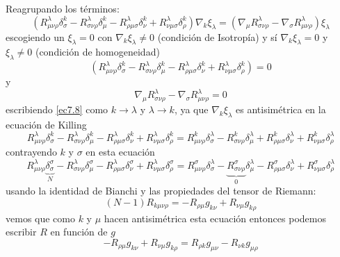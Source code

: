 \documentclass[../main]{subfiles}
\begin{document}
\begin{adjustwidth}{0pt}{-100pt}
Reagrupando los términos:
\begin{equation}
    (R^{\lambda}_{\mu\nu\rho}\delta^k_{\sigma}-R^{\lambda}_{\sigma\nu\rho}\delta^k_{\mu}-R^{\lambda}_{\rho\mu\sigma}\delta^k_{\nu}+R^{\lambda}_{\nu\mu\sigma}\delta^k_{\rho})\nabla_k \xi_{\lambda}=(\nabla_{\mu}R^{\lambda}_{\sigma\nu\rho}-\nabla_{\sigma}R^{\lambda}_{\mu\nu\rho})\xi_{\lambda}
\end{equation}
escogiendo un $\xi_{\lambda}=0$ con $\nabla_k \xi_{\lambda} \neq 0$ (condición de Isotropía) y sí $\nabla_k \xi_{\lambda}=0$ y $\xi_{\lambda} \neq 0$ (condición de homogeneidad)
\begin{equation}
    (R^{\lambda}_{\mu\nu\rho}\delta^k_{\sigma}-R^{\lambda}_{\sigma\nu\rho}\delta^k_{\mu}-R^{\lambda}_{\rho\mu\sigma}\delta^k_{\nu}+R^{\lambda}_{\nu\mu\sigma}\delta^k_{\rho})=0
    \label{ec7.8}
\end{equation}
y
\begin{equation}
    \nabla_{\mu}R^{\lambda}_{\sigma\nu\rho}-\nabla_{\sigma}R^{\lambda}_{\mu\nu\rho}=0
\end{equation}
escribiendo \eqref{ec7.8} como $k\rightarrow \lambda$ y $\lambda\rightarrow k$, ya que $\nabla_k \xi_{\lambda}$ es antisimétrica en la ecuación de Killing
\begin{equation}
    R^{\lambda}_{\mu\nu\rho}\delta^k_{\sigma}-R^{\lambda}_{\sigma\nu\rho}\delta^k_{\mu}-R^{\lambda}_{\rho\mu\sigma}\delta^k_{\nu}+R^{\lambda}_{\nu\mu\sigma}\delta^k_{\rho}=R^k_{\mu\nu\rho}\delta^{\lambda}_{\sigma}-R^k_{\sigma\nu\rho}\delta^{\lambda}_{\mu}+R^k_{\rho\mu\sigma}\delta^{\lambda}_{\nu}+R^k_{\nu\mu\sigma}\delta^{\lambda}_{\rho}
\end{equation}
contrayendo $k$ y $\sigma$ en esta ecuación
\begin{equation}
    R^{\lambda}_{\mu\nu\rho}\underbrace{\delta^{\sigma}_{\sigma}}_{N}-R^{\lambda}_{\sigma\nu\rho}\delta^{\sigma}_{\mu}-R^{\lambda}_{\rho\mu\sigma}\delta^{\sigma}_{\nu}+R^{\lambda}_{\nu\mu\sigma}\delta^{\sigma}_{\rho}=R^{\sigma}_{\mu\nu\rho}\delta^{\lambda}_{\sigma}-\underbrace{R^{\sigma}_{\sigma\nu\rho}}_{0}\delta^{\lambda}_{\mu}-R^{\sigma}_{\rho\mu\sigma}\delta^{\lambda}_{\nu}+R^{\sigma}_{\nu\mu\sigma}\delta^{\lambda}_{\rho}
\end{equation}
usando la identidad de Bianchi y las propiedades del tensor de Riemann:
\begin{equation}
    (N-1)R_{k\mu\nu\rho}=-R_{\rho\mu}g_{k\nu}+R_{\nu\mu}g_{k\rho}
    \label{ec7.12}
\end{equation}
vemos que como $k$ y $\mu$ hacen antisimétrica esta ecuación entonces podemos escribir $R$ en función de $g$
\begin{equation}
    -R_{\rho\mu}g_{k\nu}+R_{\nu\mu}g_{k\rho}=R_{\rho k}g_{\mu\nu}-R_{\nu k}g_{\mu\rho}
\end{equation}


\end{adjustwidth}
\end{document}
